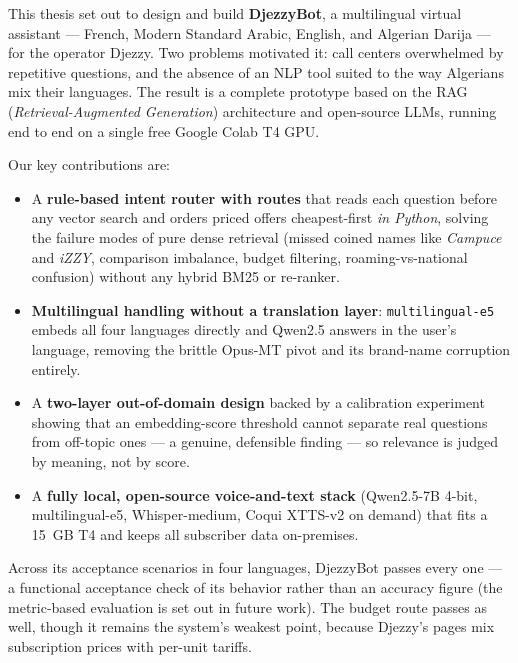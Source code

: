 \documentclass[12pt, a4paper]{report}
\newcommand{\humantext}[1]{#1}      %
\begin{document}
\humantext{This thesis set out to design and build \textbf{DjezzyBot}, a multilingual virtual assistant --- French, Modern Standard Arabic, English, and Algerian Darija --- for the operator Djezzy. Two problems motivated it: call centers overwhelmed by repetitive questions, and the absence of an NLP tool suited to the way Algerians mix their languages. The result is a complete prototype based on the RAG (\textit{Retrieval-Augmented Generation}) architecture and open-source LLMs, running end to end on a single free Google Colab T4 GPU.}

\humantext{Our key contributions are:}
\begin{itemize}
    \item \humantext{A \textbf{rule-based intent router with \numRoutes{} routes} that reads each question before any vector search and orders priced offers cheapest-first \emph{in Python}, solving the failure modes of pure dense retrieval (missed coined names like \textit{Campuce} and \textit{iZZY}, comparison imbalance, budget filtering, roaming-vs-national confusion) without any hybrid BM25 or re-ranker.}
    \item \humantext{\textbf{Multilingual handling without a translation layer}: \texttt{multilingual-e5} embeds all four languages directly and Qwen2.5 answers in the user's language, removing the brittle Opus-MT pivot and its brand-name corruption entirely.}
    \item \humantext{A \textbf{two-layer out-of-domain design} backed by a calibration experiment showing that an embedding-score threshold cannot separate real questions from off-topic ones --- a genuine, defensible finding --- so relevance is judged by meaning, not by score.}
    \item \humantext{A \textbf{fully local, open-source voice-and-text stack} (Qwen2.5-7B 4-bit, multilingual-e5, Whisper-medium, Coqui XTTS-v2 on demand) that fits a 15~GB T4 and keeps all subscriber data on-premises.}
\end{itemize}

\humantext{Across its \numTestsTotal{} acceptance scenarios in four languages, DjezzyBot passes every one --- a functional acceptance check of its behavior rather than an accuracy figure (the metric-based evaluation is set out in future work). The budget route passes as well, though it remains the system's weakest point, because Djezzy's pages mix subscription prices with per-unit tariffs.}
\end{document}
